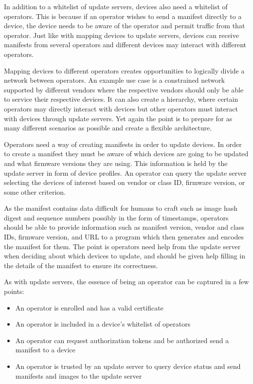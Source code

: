 \documentclass[0-thesis.tex]{subfiles}
\begin{document}
In addition to a whitelist of update servers, devices also need a whitelist of operators.
This is because if an operator wishes to send a manifest directly to a device, the device
needs to be aware of the operator and permit traffic from that operator. Just like with
mapping devices to update servers, devices can receive manifests from several operators
and different devices may interact with different operators. 

Mapping devices to different operators creates opportunities to logically divide a network
between operators. An example use case is a constrained network supported by different
vendors where the respective vendors should only be able to service their respective
devices. It can also create a hierarchy, where certain operators may directly interact
with devices but other operators must interact with devices through update servers. Yet
again the point is to prepare for as many different scenarios as possible and create a
flexible architecture.

Operators need a way of creating manifests in order to update devices. In order to create
a manifest they must be aware of which devices are going to be updated and what firmware
versions they are using. This information is held by the update server in form of device
profiles. An operator can query the update server selecting the devices of interest based
on vendor or class ID, firmware version, or some other criterion. 

As the manifest contains data difficult for humans to craft such as image hash digest and
sequence numbers possibly in the form of timestamps, operators should be able to provide
information such as manifest version, vendor and class IDs, firmware version, and URL to a
program which then generates and encodes the manifest for them. The point is operators
need help from the update server when deciding about which devices to update, and should
be given help filling in the details of the manifest to ensure its correctness.

As with update servers, the essence of being an operator can be captured in a few points:

\begin{itemize}
    \item An operator is enrolled and has a valid certificate
    \item An operator is included in a device's whitelist of operators
    \item An operator can request authorization tokens and be authorized send a manifest
            to a device
    \item An operator is trusted by an update server to query device status and send
            manifests and images to the update server
\end{itemize}
\end{document}
